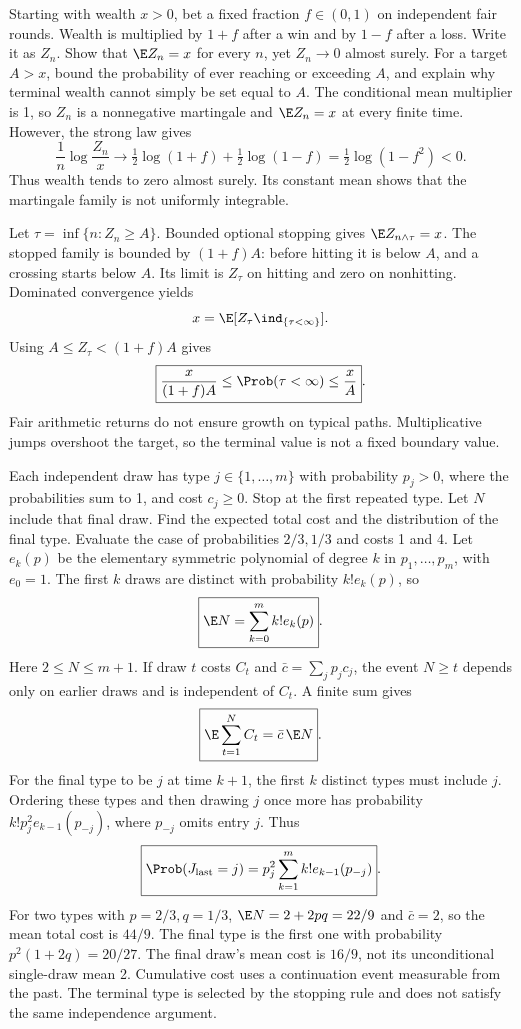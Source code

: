 Starting with wealth $x>0$, bet a fixed fraction $f\in(0,1)$ on independent fair rounds. Wealth is multiplied by $1+f$ after a win and by $1-f$ after a loss. Write it as $Z_n$. Show that $\E Z_n=x$ for every $n$, yet $Z_n\to0$ almost surely. For a target $A>x$, bound the probability of ever reaching or exceeding $A$, and explain why terminal wealth cannot simply be set equal to $A$.
\solution The conditional mean multiplier is 1, so $Z_n$ is a nonnegative martingale and $\E Z_n=x$ at every finite time. However, the strong law gives
\[
 \frac1n\log\frac{Z_n}{x}\longrightarrow
 \tfrac12\log(1+f)+\tfrac12\log(1-f)
 =\tfrac12\log(1-f^2)<0.
\]
Thus wealth tends to zero almost surely. Its constant mean shows that the martingale family is not uniformly integrable.

Let $\tau=\inf\{n:Z_n\ge A\}$. Bounded optional stopping gives $\E Z_{n\wedge\tau}=x$. The stopped family is bounded by $(1+f)A$: before hitting it is below $A$, and a crossing starts below $A$. Its limit is $Z_\tau$ on hitting and zero on nonhitting. Dominated convergence yields
\[
 x=\E[Z_\tau\ind_{\{\tau<\infty\}}].
\]
Using $A\le Z_\tau<(1+f)A$ gives
\[
 \boxed{\frac{x}{(1+f)A}\le\Prob(\tau<\infty)\le\frac xA}.
\]
\insight Fair arithmetic returns do not ensure growth on typical paths. Multiplicative jumps overshoot the target, so the terminal value is not a fixed boundary value.

Each independent draw has type $j\in\{1,\ldots,m\}$ with probability $p_j>0$, where the probabilities sum to 1, and cost $c_j\ge0$. Stop at the first repeated type. Let $N$ include that final draw. Find the expected total cost and the distribution of the final type. Evaluate the case of probabilities $2/3,1/3$ and costs 1 and 4.
\solution Let $e_k(p)$ be the elementary symmetric polynomial of degree $k$ in $p_1,\ldots,p_m$, with $e_0=1$. The first $k$ draws are distinct with probability $k!e_k(p)$, so
\[
 \boxed{\E N=\sum_{k=0}^m k!e_k(p)}.
\]
Here $2\le N\le m+1$. If draw $t$ costs $C_t$ and $\bar c=\sum_jp_jc_j$, the event $N\ge t$ depends only on earlier draws and is independent of $C_t$. A finite sum gives
\[
 \boxed{\E\sum_{t=1}^N C_t=\bar c\,\E N}.
\]
For the final type to be $j$ at time $k+1$, the first $k$ distinct types must include $j$. Ordering these types and then drawing $j$ once more has probability $k!p_j^2e_{k-1}(p_{-j})$, where $p_{-j}$ omits entry $j$. Thus
\[
 \boxed{\Prob(J_{\rm last}=j)=p_j^2\sum_{k=1}^m k!e_{k-1}(p_{-j})}.
\]
For two types with $p=2/3,q=1/3$, $\E N=2+2pq=22/9$ and $\bar c=2$, so the mean total cost is $\boxed{44/9}$. The final type is the first one with probability $p^2(1+2q)=20/27$. The final draw's mean cost is $\boxed{16/9}$, not its unconditional single-draw mean 2.
\insight Cumulative cost uses a continuation event measurable from the past. The terminal type is selected by the stopping rule and does not satisfy the same independence argument.

